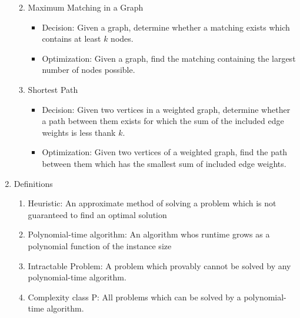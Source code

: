 \documentclass[12pt, letter]{article}
\begin{document}
\begin{enumerate}
\begin{enumerate}
\begin{itemize}
		\end{itemize}
		\item Maximum Matching in a Graph
		\begin{itemize}
			\item Decision: Given a graph, determine whether a matching exists which contains at least $k$ nodes.
			\item Optimization: Given a graph, find the matching containing the largest number of nodes possible.
		\end{itemize}
		\item Shortest Path
		\begin{itemize}
			\item Decision: Given two vertices in a weighted graph, determine whether a path between them exists for which the sum of the included edge weights is less thank $k$.
			\item Optimization: Given two vertices of a weighted graph, find the path between them which has the smallest sum of included edge weights.
		\end{itemize}
	\end{enumerate}
	\item Definitions
	\begin{enumerate}
		\item Heuristic: An approximate method of solving a problem which is not guaranteed to find an optimal solution
		\item Polynomial-time algorithm: An algorithm whos runtime grows as a polynomial function of the instance size
		\item Intractable Problem: A problem which provably cannot be solved by any polynomial-time algorithm.
		\item Complexity class P: All problems which can be solved by a polynomial-time algorithm.
	\end{enumerate}
\end{enumerate}
\end{document}
